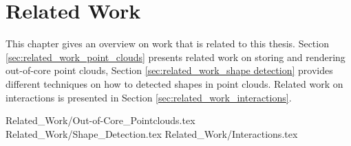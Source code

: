 \chapter {Related Work}
\label{chap:related_work}

This chapter gives an overview on work that is related to this thesis. Section \ref{sec:related_work_point_clouds} presents related work on storing and rendering out-of-core point clouds, Section \ref{sec:related_work_shape detection} provides different techniques on how to detected shapes in point clouds. Related work on interactions is presented in Section \ref{sec:related_work_interactions}. 

 {Related_Work/Out-of-Core_Pointclouds.tex}
 {Related_Work/Shape_Detection.tex}
 {Related_Work/Interactions.tex}